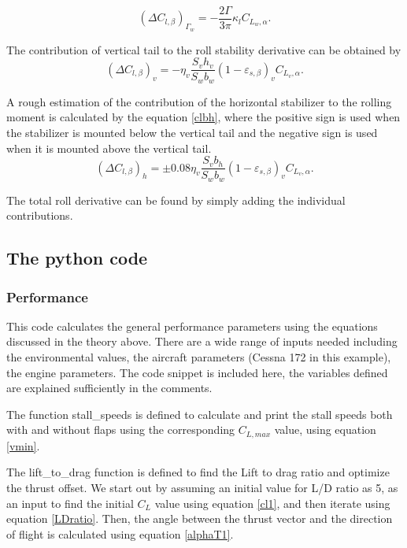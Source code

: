 \documentclass[letterpaper,12pt]{article}
\begin{document}
\begin{equation}
\boxed{
(\Delta C_{l,\beta})_{\Gamma_w}=-\frac{2\Gamma}{3\pi}\kappa_lC_{L_w,\alpha}.
\label{clbg}
}
\end{equation}

The contribution of vertical tail to the roll stability derivative can be obtained by
\begin{equation}
\boxed{
(\Delta C_{l,\beta})_v=-\eta_v\frac{S_vh_v}{S_wb_w}(1-\varepsilon_{s,\beta})_vC_{L_v,\alpha}.
}
\label{clbv}
\end{equation}

A rough estimation of the contribution of the horizontal stabilizer to the rolling moment is calculated by the equation \ref{clbh}, where the positive sign is used when the stabilizer is mounted below the vertical tail and the negative sign is used when it is mounted above the vertical tail.
\begin{equation}
\boxed{
(\Delta C_{l,\beta})_h=\pm0.08\eta_v\frac{S_vb_h}{S_wb_w}(1-\varepsilon_{s,\beta})_vC_{L_v,\alpha}.
\label{clbh}
}
\end{equation}

The total roll derivative can be found by simply adding the individual contributions.

\subsection{The python code}
\lstset{inputpath=./performance/}

\subsubsection{Performance}

This code calculates the general performance parameters using the equations discussed in the theory above. There are a wide range of inputs needed including the environmental values, the aircraft parameters (Cessna 172 in this example), the engine parameters. The code snippet is included here, the variables defined are explained sufficiently in the comments.


The function stall\_speeds is defined to calculate and print the stall speeds both with and without flaps using the corresponding $C_{L,max}$ value, using equation \ref{vmin}.


The lift\_to\_drag function is defined to find the Lift to drag ratio and optimize the thrust offset. We start out by assuming an initial value for L/D ratio as 5, as an input to find the initial $C_L$ value using equation \ref{cl1}, and then iterate using equation \ref{LDratio}. Then, the angle between the thrust vector and the direction of flight is calculated using equation \ref{alphaT1}.

\end{document}
